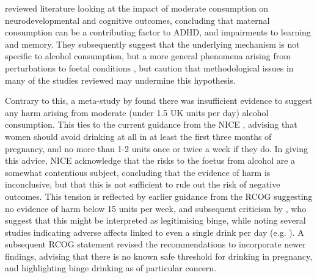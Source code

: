 \citet{Huizink2006} reviewed literature looking at the impact of
moderate consumption on neurodevelopmental and cognitive outcomes,
concluding that maternal consumption can be a contributing factor
to \ac{ADHD}, and impairments to learning and memory. They subsequently
suggest that the underlying mechanism is not specific to alcohol consumption,
but a more general phenomena arising from perturbations to foetal
conditions \citep{Huizink2009}, but caution that methodological issues
in many of the studies reviewed may undermine this hypothesis.

Contrary to this, a meta-study by \citet{Gray2006} found there was
insufficient evidence to suggest any harm arising from moderate (under
1.5 UK units per day) alcohol consumption. This ties to the current
guidance from the \ac{NICE} \citep{NICE2010a}, advising that women
should avoid drinking at all in at least the first three months of
pregnancy, and no more than 1-2 units once or twice a week if they
do. In giving this advice, \ac{NICE} acknowledge that the risks to
the foetus from alcohol are a somewhat contentious subject, concluding
that the evidence of harm is inconclusive, but that this is not sufficient
to rule out the risk of negative outcomes. This tension is reflected
by earlier guidance from the \ac{RCOG} \citep{Gynecologists1996}
suggesting no evidence of harm below 15 units per week, and subsequent
criticism by \citet{Guerri1999}, who suggest that this might be interpreted
as legitimising \gls{binge}, while noting several studies indicating
adverse affects linked to even a single drink per day (e.g. \citet{Day1990}).
A subsequent \ac{RCOG} statement \citep{RoyalCollegeofObstetriciansandGynaecologists2006}
revised the recommendations to incorporate newer findings, advising
that there is no known safe threshold for drinking in pregnancy, and
highlighting binge drinking as of particular concern.

